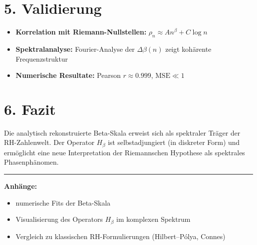 \documentclass[11pt,a4paper]{article}
\begin{document}
\section*{5. Validierung}
\begin{itemize}
    \item \textbf{Korrelation mit Riemann-Nullstellen:} \(\rho_n \approx A n^\beta + C \log n\)
    \item \textbf{Spektralanalyse:} Fourier-Analyse der \(\Delta \beta(n)\) zeigt kohärente Frequenzstruktur
    \item \textbf{Numerische Resultate:} Pearson \(r \approx 0.999\), \( \text{MSE} \ll 1 \)
\end{itemize}

\section*{6. Fazit}
Die analytisch rekonstruierte Beta-Skala erweist sich als spektraler Träger der RH-Zahlenwelt. Der Operator \( H_\beta \) ist selbstadjungiert (in diskreter Form) und ermöglicht eine neue Interpretation der Riemannschen Hypothese als spektrales Phasenphänomen.

\vspace{0.5cm}
\hrule
\vspace{0.2cm}
\noindent \textbf{Anhänge:}
\begin{itemize}
    \item numerische Fits der Beta-Skala
    \item Visualisierung des Operators \( H_\beta \) im komplexen Spektrum
    \item Vergleich zu klassischen RH-Formulierungen (Hilbert–Pólya, Connes)
\end{itemize}
\end{document}

